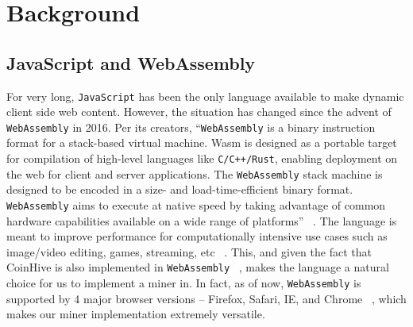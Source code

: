 \documentclass[runningheads]{llncs}
\newcommand{\trishita}[1]{{\color{magenta}\bfseries[Trishita: #1]}}
\begin{document}
\section{Background}
\subsection{JavaScript and WebAssembly}
For very long, \verb|JavaScript| has been the only language available to make dynamic client side web content. However, the situation has changed since the advent of \verb|WebAssembly| in 2016. Per its creators, ``\verb|WebAssembly| is a binary instruction format for a stack-based virtual machine. Wasm is designed as a portable target for compilation of high-level languages like \verb|C/C++/Rust|, enabling deployment on the web for client and server applications. The \verb|WebAssembly| stack machine is designed to be encoded in a size- and load-time-efficient binary format. \verb|WebAssembly| aims to execute at native speed by taking advantage of common hardware capabilities available on a wide range of platforms'' ~\cite{webAssembly}. The language is meant to improve performance for computationally intensive use cases such as image/video editing, games, streaming, etc ~\cite{webAssembly}. This, and given the fact that CoinHive is also implemented in \verb|WebAssembly| ~\cite{coinhive}, makes the language a natural choice for us to implement a miner in. In fact, as of now, \verb|WebAssembly| is supported by 4 major browser versions -- Firefox, Safari, IE, and Chrome ~\cite{webAssembly}, which makes our miner implementation extremely versatile.


\end{document}
